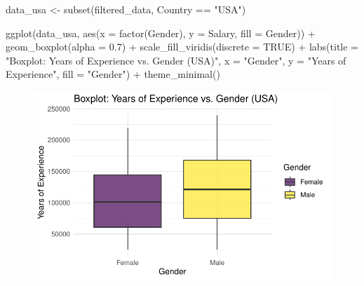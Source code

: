 \documentclass[
  letterpaper,
  DIV=11,
  numbers=noendperiod]{scrartcl}
\newenvironment{Shaded}{\begin{snugshade}}{\end{snugshade}}
\newcommand{\AttributeTok}[1]{\textcolor[rgb]{0.40,0.45,0.13}{#1}}
\newcommand{\ConstantTok}[1]{\textcolor[rgb]{0.56,0.35,0.01}{#1}}
\newcommand{\FloatTok}[1]{\textcolor[rgb]{0.68,0.00,0.00}{#1}}
\newcommand{\FunctionTok}[1]{\textcolor[rgb]{0.28,0.35,0.67}{#1}}
\newcommand{\NormalTok}[1]{\textcolor[rgb]{0.00,0.23,0.31}{#1}}
\newcommand{\OtherTok}[1]{\textcolor[rgb]{0.00,0.23,0.31}{#1}}
\newcommand{\SpecialCharTok}[1]{\textcolor[rgb]{0.37,0.37,0.37}{#1}}
\newcommand{\StringTok}[1]{\textcolor[rgb]{0.13,0.47,0.30}{#1}}
\begin{document}
\begin{Shaded}
\begin{Highlighting}[]
\NormalTok{data\_usa }\OtherTok{\textless{}{-}} \FunctionTok{subset}\NormalTok{(filtered\_data, Country }\SpecialCharTok{==} \StringTok{"USA"}\NormalTok{)}

\FunctionTok{ggplot}\NormalTok{(data\_usa, }\FunctionTok{aes}\NormalTok{(}\AttributeTok{x =} \FunctionTok{factor}\NormalTok{(Gender), }\AttributeTok{y =}\NormalTok{ Salary, }\AttributeTok{fill =}\NormalTok{ Gender)) }\SpecialCharTok{+}
  \FunctionTok{geom\_boxplot}\NormalTok{(}\AttributeTok{alpha =} \FloatTok{0.7}\NormalTok{) }\SpecialCharTok{+}
  \FunctionTok{scale\_fill\_viridis}\NormalTok{(}\AttributeTok{discrete =} \ConstantTok{TRUE}\NormalTok{) }\SpecialCharTok{+}
  \FunctionTok{labs}\NormalTok{(}\AttributeTok{title =} \StringTok{"Boxplot: Years of Experience vs. Gender (USA)"}\NormalTok{,}
       \AttributeTok{x =} \StringTok{"Gender"}\NormalTok{,}
       \AttributeTok{y =} \StringTok{"Years of Experience"}\NormalTok{,}
       \AttributeTok{fill =} \StringTok{"Gender"}\NormalTok{) }\SpecialCharTok{+}
  \FunctionTok{theme\_minimal}\NormalTok{()}
\end{Highlighting}
\end{Shaded}

\begin{figure}[H]

{\centering \includegraphics{main_doc_files/figure-pdf/unnamed-chunk-69-1.pdf}

}

\end{figure}
\end{document}
